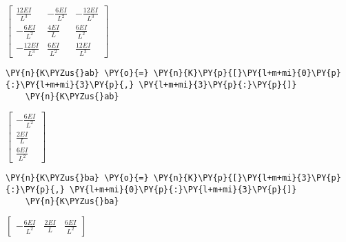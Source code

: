                 
    
    $\displaystyle \left[\begin{matrix}\frac{12 E I}{L^{3}} & - \frac{6 E I}{L^{2}} & - \frac{12 E I}{L^{3}}\\- \frac{6 E I}{L^{2}} & \frac{4 E I}{L} & \frac{6 E I}{L^{2}}\\- \frac{12 E I}{L^{3}} & \frac{6 E I}{L^{2}} & \frac{12 E I}{L^{3}}\end{matrix}\right]$
    
        
    
\begin{tcolorbox}[breakable, size=fbox, boxrule=1pt, pad at break*=1mm,colback=cellbackground, colframe=cellborder]
    \begin{Verbatim}[commandchars=\\\{\}]
    \PY{n}{K\PYZus{}ab} \PY{o}{=} \PY{n}{K}\PY{p}{[}\PY{l+m+mi}{0}\PY{p}{:}\PY{l+m+mi}{3}\PY{p}{,} \PY{l+m+mi}{3}\PY{p}{:}\PY{p}{]}
    \PY{n}{K\PYZus{}ab}
    \end{Verbatim}
\end{tcolorbox}
     
                
    
    $\displaystyle \left[\begin{matrix}- \frac{6 E I}{L^{2}}\\\frac{2 E I}{L}\\\frac{6 E I}{L^{2}}\end{matrix}\right]$

        
    
\begin{tcolorbox}[breakable, size=fbox, boxrule=1pt, pad at break*=1mm,colback=cellbackground, colframe=cellborder]
    \begin{Verbatim}[commandchars=\\\{\}]
    \PY{n}{K\PYZus{}ba} \PY{o}{=} \PY{n}{K}\PY{p}{[}\PY{l+m+mi}{3}\PY{p}{:}\PY{p}{,} \PY{l+m+mi}{0}\PY{p}{:}\PY{l+m+mi}{3}\PY{p}{]}
    \PY{n}{K\PYZus{}ba}
    \end{Verbatim}
\end{tcolorbox}
     
                
    
    $\displaystyle \left[\begin{matrix}- \frac{6 E I}{L^{2}} & \frac{2 E I}{L} & \frac{6 E I}{L^{2}}\end{matrix}\right]$
    
